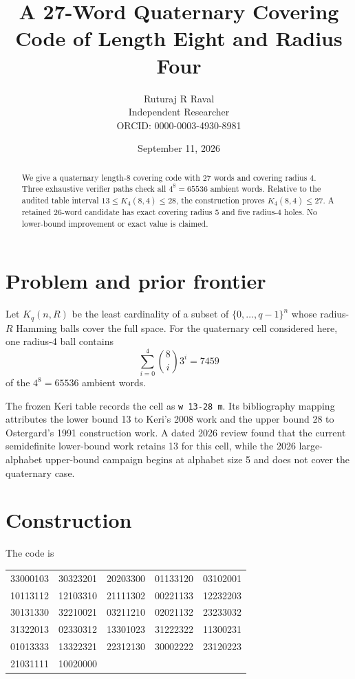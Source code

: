 \documentclass[11pt]{article}
\title{A 27-Word Quaternary Covering Code of Length Eight and Radius Four}
\author{Ruturaj R Raval\\Independent Researcher\\
ORCID: 0000-0003-4930-8981}
\date{September 11, 2026}
\begin{document}
\maketitle

\begin{abstract}
We give a quaternary length-8 covering code with 27 words and covering
radius 4. Three exhaustive verifier paths check all $4^8=65536$ ambient
words. Relative to the audited table interval
$13 \leq K_4(8,4) \leq 28$, the construction proves
$K_4(8,4) \leq 27$. A retained 26-word candidate has exact covering radius
5 and five radius-4 holes. No lower-bound improvement or exact value is
claimed.
\end{abstract}

\section{Problem and prior frontier}

Let $K_q(n,R)$ be the least cardinality of a subset of
$\{0,\ldots,q-1\}^n$ whose radius-$R$ Hamming balls cover the full space.
For the quaternary cell considered here, one radius-4 ball contains
\[
  \sum_{i=0}^{4} \binom{8}{i}3^i = 7459
\]
of the $4^8=65536$ ambient words.

The frozen Keri table records the cell as \texttt{w 13-28 m}. Its
bibliography mapping attributes the lower bound 13 to Keri's 2008 work and
the upper bound 28 to Ostergard's 1991 construction work. A dated
2026 review found that the current semidefinite lower-bound work retains 13
for this cell, while the 2026 large-alphabet upper-bound campaign begins at
alphabet size 5 and does not cover the quaternary case.

\section{Construction}

The code is
\begin{center}
\begin{tabular}{rrrrr}
\toprule
33000103 & 30323201 & 20203300 & 01133120 & 03102001\\
10113112 & 12103310 & 21111302 & 00221133 & 12232203\\
30131330 & 32210021 & 03211210 & 02021132 & 23233032\\
31322013 & 02330312 & 13301023 & 31222322 & 11300231\\
01013333 & 13322321 & 22312130 & 30002222 & 23120223\\
21031111 & 10020000 & & &\\
\bottomrule
\end{tabular}
\end{center}
\end{document}
